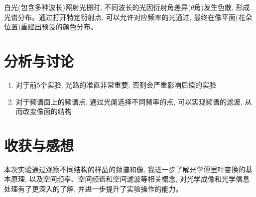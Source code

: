 \documentclass[12pt]{article}
\numberwithin{equation}{section}
\numberwithin{figure}{section}
\begin{document}
白光(包含多种波长)照射光栅时, 不同波长的光因衍射角差异($\theta$角)发生色散, 形成光谱分布。通过打开特定衍射点, 可以允许对应频率的光通过, 最终在像平面(花朵位置)重建出预设的颜色分布。

\section{分析与讨论}

\begin{enumerate}
    \item 对于前5个实验, 光路的准直非常重要, 否则会严重影响后续的实验
    \item 对于频谱面上的频谱点, 通过光阑选择不同频率的点, 可以实现频谱的滤波, 从而改变像面的结构
\end{enumerate}

\section{收获与感想}

本次实验通过观察不同结构的样品的频谱和像, 我进一步了解光学傅里叶变换的基本原理, 以及空间频率、空间频谱和空间滤波等相关概念, 对光学成像和光学信息处理有了更深入的了解, 并进一步提升了实验操作的能力。
\end{document}
